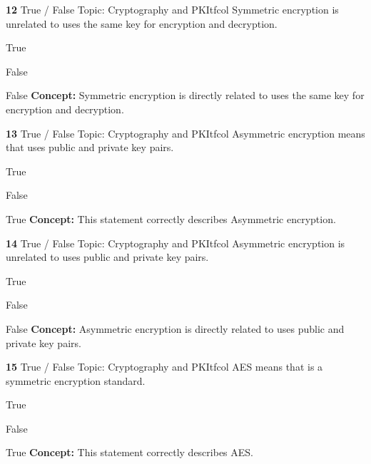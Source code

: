 \documentclass[10pt,a4paper]{article}
\begin{document}
\begin{qcard}{\color{white}\textbf{12} \hfill \small True / False \textbar{} Topic: Cryptography and PKI}{tfcol}
Symmetric encryption is unrelated to uses the same key for encryption and decryption.

\begin{qoptions}
\item True
\item False
\end{qoptions}
\begin{explainbox}{False}
\textbf{Concept:} Symmetric encryption is directly related to uses the same key for encryption and decryption.
\end{explainbox}
\end{qcard}

\begin{qcard}{\color{white}\textbf{13} \hfill \small True / False \textbar{} Topic: Cryptography and PKI}{tfcol}
Asymmetric encryption means that uses public and private key pairs.

\begin{qoptions}
\item True
\item False
\end{qoptions}
\begin{explainbox}{True}
\textbf{Concept:} This statement correctly describes Asymmetric encryption.
\end{explainbox}
\end{qcard}

\begin{qcard}{\color{white}\textbf{14} \hfill \small True / False \textbar{} Topic: Cryptography and PKI}{tfcol}
Asymmetric encryption is unrelated to uses public and private key pairs.

\begin{qoptions}
\item True
\item False
\end{qoptions}
\begin{explainbox}{False}
\textbf{Concept:} Asymmetric encryption is directly related to uses public and private key pairs.
\end{explainbox}
\end{qcard}

\begin{qcard}{\color{white}\textbf{15} \hfill \small True / False \textbar{} Topic: Cryptography and PKI}{tfcol}
AES means that is a symmetric encryption standard.

\begin{qoptions}
\item True
\item False
\end{qoptions}
\begin{explainbox}{True}
\textbf{Concept:} This statement correctly describes AES.
\end{explainbox}
\end{qcard}
\end{document}
